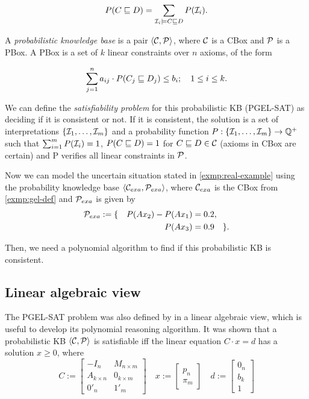 \[
	P(C \sqsubseteq D) = \sum_{\mathcal{I}_i \models C \sqsubseteq D} P(\mathcal{I}_i).
\]

A \emph{probabilistic knowledge base} is a pair $\langle\mathcal{C}, \mathcal{P}\rangle$, where $\mathcal{C}$ is a CBox and $\mathcal{P}$ is a PBox. A PBox is a set of $k$ linear constraints over $n$ axioms, of the form

\begin{equation}
	\label{eq:pbox-restric}
	\sum_{j = 1}^n a_{ij} \cdot P(C_j \sqsubseteq D_j) \leq b_i; \quad 1 \leq i \leq k.
\end{equation}

We can define the \emph{satisfiability problem} for this probabilistic KB (PGEL-SAT) as deciding if it is consistent or not. If it is consistent, the solution is a set of interpretations $\{\mathcal{I}_1, \dots, \mathcal{I}_m \}$ and a probability function $P: \{\mathcal{I}_1, \dots, \mathcal{I}_m \} \to \mathbb{Q}^+$ such that $\sum_{i = 1}^m P(\mathcal{I}_i) = 1$, $P(C \sqsubseteq D) = 1$ for $C \sqsubseteq D \in \mathcal{C}$ (axioms in CBox are certain) and P verifies all linear constraints in $\mathcal{P}$.
% 
\begin{example}
	Now we can model the uncertain situation stated in \autoref{exmp:real-example} using the probability knowledge base $\langle\mathcal{C}_{exa}, \mathcal{P}_{exa}\rangle$, where $\mathcal{C}_{exa}$ is the CBox from \autoref{exmp:gel-def} and $\mathcal{P}_{exa}$ is given by
	\begin{align*}
		\mathcal{P}_{exa} := \{ \quad P(Ax_2) - P(Ax_1) & = 0.2,           \\
		P(Ax_3)                                 & = 0.9  \quad \}.
	\end{align*}

	Then, we need a polynomial algorithm to find if this probabilistic KB is consistent.
\end{example}
% 
\subsection{Linear algebraic view}

The PGEL-SAT problem was also defined by \citet{Fin2020} in a linear algebraic view, which is useful to develop its polynomial reasoning algorithm. It was shown that a probabilistic KB $\langle\mathcal{C}, \mathcal{P}\rangle$ is satisfiable iff the linear equation $C \cdot x = d$ has a solution $x \geq 0$, where
% 
\begin{equation}
	\label{pbox-linear}
	C := \begin{bmatrix}
		-I_n           & M_{n \times m} \\
		A_{k \times n} & 0_{k \times m} \\
		0'_n           & 1'_{m}
	\end{bmatrix}
	\quad
	x := \begin{bmatrix}
		p_n \\
		\pi_m
	\end{bmatrix}
	\quad
	d := \begin{bmatrix}
		0_n \\
		b_k \\
		1
	\end{bmatrix}
\end{equation}

